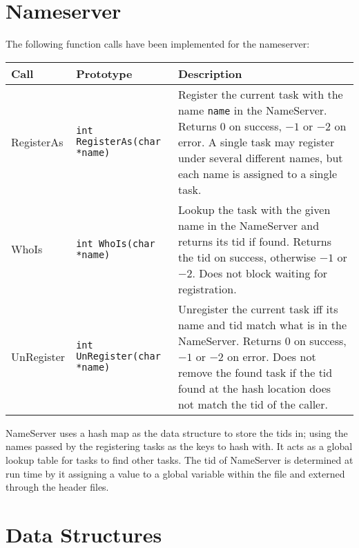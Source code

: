 \documentclass[12pt]{article}
\begin{document}
\section{Nameserver}
The following function calls have been implemented for the nameserver:
\begin{center}
  \begin{tabular}{|l|l|p{8cm}|}
    \hline
    {\bf Call} & {\bf Prototype} & {\bf Description} \\\hline
    RegisterAs & \texttt{int RegisterAs(char *name)} & Register the current task with the name \texttt{name} in the NameServer.  Returns $0$ on success, $-1$ or $-2$ on error. A single task may register under several different names, but each name is assigned to a single task.\\\hline
    WhoIs & \texttt{int WhoIs(char *name)} & Lookup the task with the given name in the NameServer and returns its tid if found.  Returns the tid on success, otherwise $-1$ or $-2$.  Does not block waiting for registration.\\\hline
    UnRegister & \texttt{int UnRegister(char *name)} & Unregister the current task iff its name and tid match what is in the NameServer.  Returns $0$ on success, $-1$ or $-2$ on error.  Does not remove the found task if the tid found at the hash location does not match the tid of the caller.\\\hline
  \end{tabular}
\end{center}
NameServer uses a hash map as the data structure to store the tids in; using the names passed by the registering tasks as the keys to hash with.  It acts as a global lookup table for tasks to find other tasks.  The tid of NameServer is determined at run time by it assigning a value to a global variable within the file and externed through the header files.
\\[2\baselineskip]

\section{Data Structures}
\end{document}
